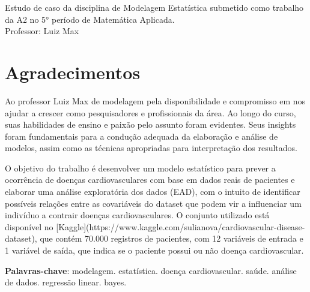 \documentclass[article,11pt,a4paper,brazil]{abntex2}
\begin{document}
	
	
	\frenchspacing 
	
	
	
	\maketitle
	\thispagestyle{empty}
	\begin{citacao}
		Estudo de caso da disciplina de Modelagem Estatística submetido como trabalho da A2 no 5° período de Matemática Aplicada.\\
		Professor: Luiz Max
	\end{citacao}

\newpage
\thispagestyle{empty}

	\section*{Agradecimentos}
	Ao professor Luiz Max de modelagem pela disponibilidade e compromisso em nos ajudar a crescer como pesquisadores e profissionais da área. Ao longo do curso, suas habilidades de ensino e paixão pelo assunto foram evidentes. Seus insights foram fundamentais para a condução adequada da elaboração e análise de modelos, assim como as técnicas apropriadas para interpretação dos resultados.
\newpage	

\thispagestyle{empty}
	
\begin{resumoumacoluna}
		O objetivo do trabalho é desenvolver um modelo estatístico para prever a ocorrência de doenças cardiovasculares com base em dados reais de pacientes e elaborar uma análise exploratória dos dados (EAD), com o intuito de identificar possíveis relações entre as covariáveis do dataset que podem vir a influenciar um indivíduo a contrair doenças cardiovasculares. O conjunto utilizado está disponível no [Kaggle](https://www.kaggle.com/sulianova/cardiovascular-disease-dataset), que contém 70.000 registros de pacientes, com 12 variáveis de entrada e 1 variável de saída, que indica se o paciente possui ou não doença cardiovascular. 
		
		\vspace{\onelineskip}
		
		\noindent
		\textbf{Palavras-chave}: modelagem. estatística. doença cardiovascular. saúde. análise de dados. regressão linear. bayes.
\end{resumoumacoluna}
	
\end{document}
